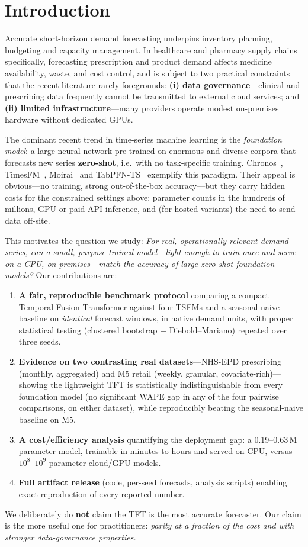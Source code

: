 \documentclass[11pt]{article}
\begin{document}
\section{Introduction}
Accurate short-horizon demand forecasting underpins inventory planning, budgeting and
capacity management. In healthcare and pharmacy supply chains specifically, forecasting
prescription and product demand affects medicine availability, waste, and cost control, and
is subject to two practical constraints that the recent literature rarely foregrounds:
\textbf{(i) data governance}---clinical and prescribing data frequently cannot be
transmitted to external cloud services; and \textbf{(ii) limited infrastructure}---many
providers operate modest on-premises hardware without dedicated GPUs.

The dominant recent trend in time-series machine learning is the \emph{foundation model}: a
large neural network pre-trained on enormous and diverse corpora that forecasts new series
\textbf{zero-shot}, i.e.\ with no task-specific training. Chronos~\cite{chronos},
TimesFM~\cite{timesfm}, Moirai~\cite{moirai} and TabPFN-TS~\cite{tabpfnts} exemplify this
paradigm. Their appeal is obvious---no training, strong out-of-the-box accuracy---but they
carry hidden costs for the constrained settings above: parameter counts in the hundreds of
millions, GPU or paid-API inference, and (for hosted variants) the need to send data
off-site.

This motivates the question we study: \emph{For real, operationally relevant demand series,
can a small, purpose-trained model---light enough to train once and serve on a CPU,
on-premises---match the accuracy of large zero-shot foundation models?} Our contributions
are:
\begin{enumerate}
\item \textbf{A fair, reproducible benchmark protocol} comparing a compact Temporal Fusion
Transformer against four TSFMs and a seasonal-naive baseline on \emph{identical} forecast
windows, in native demand units, with proper statistical testing (clustered bootstrap +
Diebold--Mariano) repeated over three seeds.
\item \textbf{Evidence on two contrasting real datasets}---NHS-EPD prescribing (monthly,
aggregated) and M5 retail (weekly, granular, covariate-rich)---showing the lightweight TFT
is statistically indistinguishable from every foundation model (no significant WAPE gap in
any of the four pairwise comparisons, on either dataset), while reproducibly beating the
seasonal-naive baseline on M5.
\item \textbf{A cost/efficiency analysis} quantifying the deployment gap: a 0.19--0.63\,M
parameter model, trainable in minutes-to-hours and served on CPU, versus $10^8$--$10^9$
parameter cloud/GPU models.
\item \textbf{Full artifact release} (code, per-seed forecasts, analysis scripts) enabling
exact reproduction of every reported number.
\end{enumerate}
We deliberately do \textbf{not} claim the TFT is the most accurate forecaster. Our claim is
the more useful one for practitioners: \emph{parity at a fraction of the cost and with
stronger data-governance properties.}
\end{document}
